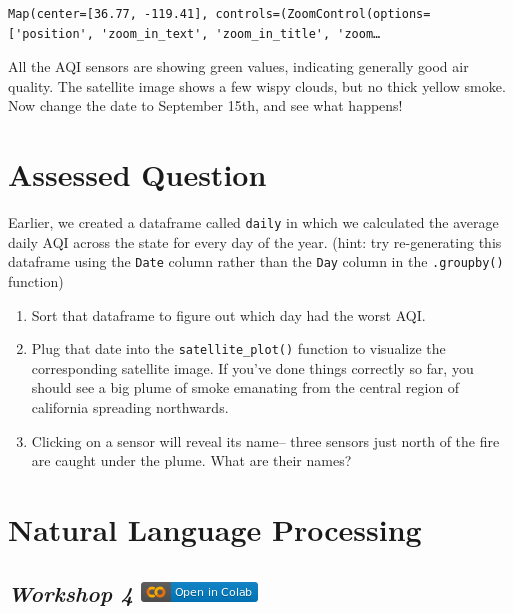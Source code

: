 \documentclass[
  letterpaper,
  DIV=11,
  numbers=noendperiod]{scrreprt}
\providecommand{\tightlist}{%
  \setlength{\itemsep}{0pt}\setlength{\parskip}{0pt}}\usepackage{longtable,booktabs,array}
\begin{document}
\begin{verbatim}
Map(center=[36.77, -119.41], controls=(ZoomControl(options=['position', 'zoom_in_text', 'zoom_in_title', 'zoom…
\end{verbatim}

All the AQI sensors are showing green values, indicating generally good
air quality. The satellite image shows a few wispy clouds, but no thick
yellow smoke. Now change the date to September 15th, and see what
happens!


\hypertarget{assessed-question-2}{%
\chapter{Assessed Question}\label{assessed-question-2}}

Earlier, we created a dataframe called \texttt{daily} in which we
calculated the average daily AQI across the state for every day of the
year. (hint: try re-generating this dataframe using the \texttt{Date}
column rather than the \texttt{Day} column in the \texttt{.groupby()}
function)

\begin{enumerate}
\def\labelenumi{\arabic{enumi}.}
\tightlist
\item
  Sort that dataframe to figure out which day had the worst AQI.
\item
  Plug that date into the \texttt{satellite\_plot()} function to
  visualize the corresponding satellite image. If you've done things
  correctly so far, you should see a big plume of smoke emanating from
  the central region of california spreading northwards.
\item
  Clicking on a sensor will reveal its name-- three sensors just north
  of the fire are caught under the plume. What are their names?
\end{enumerate}


\hypertarget{natural-language-processing}{%
\chapter{Natural Language
Processing}\label{natural-language-processing}}

\hypertarget{workshop-4-open-in-colab}{%
\section[\emph{Workshop 4} ]{\texorpdfstring{\emph{Workshop 4}
\href{https://colab.research.google.com/github/oballinger/QM2/blob/main/notebooks/W04.\%20Natural\%20Language\%20Processing.ipynb}{\protect\includegraphics{index_files/mediabag/colab-badge.png}}}{Workshop 4 Open In Colab}}\label{workshop-4-open-in-colab}}
\end{document}
